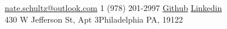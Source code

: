 \documentclass[10pt,a4paper]{article} %
\begin{document}
 



\noindent\href{mailto:nate.schultz@outlook.com}{nate.schultz@outlook.com}\bull %
\textsmaller{+}1 (978) 201-2997\bull %
\href{https://github.com/beefy}{Github} \bull \href{https://www.linkedin.com/in/beefybeefy/}{Linkedin}\\ %
430 W Jefferson St, Apt 3\bull Philadelphia PA, 19122%

\spacedhrule{0.9em}{-0.4em} %





\end{document}
